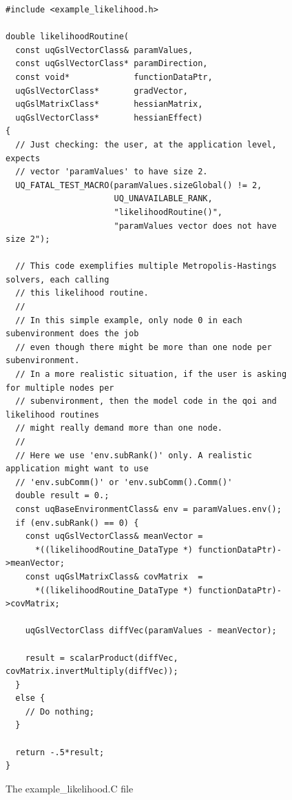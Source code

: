 \begin{figure}[h!]
\begin{center}
\begin{verbatim}
#include <example_likelihood.h>

double likelihoodRoutine(
  const uqGslVectorClass& paramValues,
  const uqGslVectorClass* paramDirection,
  const void*             functionDataPtr,
  uqGslVectorClass*       gradVector,
  uqGslMatrixClass*       hessianMatrix,
  uqGslVectorClass*       hessianEffect)
{
  // Just checking: the user, at the application level, expects
  // vector 'paramValues' to have size 2.
  UQ_FATAL_TEST_MACRO(paramValues.sizeGlobal() != 2,
                      UQ_UNAVAILABLE_RANK,
                      "likelihoodRoutine()",
                      "paramValues vector does not have size 2");

  // This code exemplifies multiple Metropolis-Hastings solvers, each calling
  // this likelihood routine.
  //
  // In this simple example, only node 0 in each subenvironment does the job
  // even though there might be more than one node per subenvironment.
  // In a more realistic situation, if the user is asking for multiple nodes per
  // subenvironment, then the model code in the qoi and likelihood routines
  // might really demand more than one node.
  //
  // Here we use 'env.subRank()' only. A realistic application might want to use
  // 'env.subComm()' or 'env.subComm().Comm()'
  double result = 0.;
  const uqBaseEnvironmentClass& env = paramValues.env();
  if (env.subRank() == 0) {
    const uqGslVectorClass& meanVector =
      *((likelihoodRoutine_DataType *) functionDataPtr)->meanVector;
    const uqGslMatrixClass& covMatrix  =
      *((likelihoodRoutine_DataType *) functionDataPtr)->covMatrix;

    uqGslVectorClass diffVec(paramValues - meanVector);

    result = scalarProduct(diffVec, covMatrix.invertMultiply(diffVec));
  }
  else {
    // Do nothing;
  }

  return -.5*result;
}
\end{verbatim}
\end{center}
\caption{
The example\_likelihood.C file
}
\label{fig-like-c}
\end{figure}

